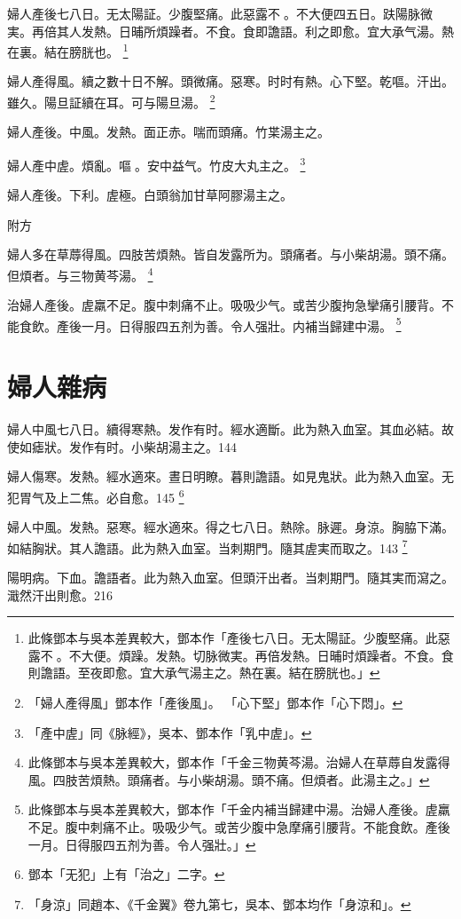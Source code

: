婦人產後七八日。无太陽証。少腹堅痛。此惡露不{\sungii 𥁞}。不大便四五日。趺陽脉微実。再倍其人发熱。日晡所煩躁者。不食。食即譫語。利之即愈。宜大承气湯。熱在裏。結在膀胱也。
	\footnote{
		此條鄧本与吳本差異較大，鄧本作「產後七八日。无太陽証。少腹堅痛。此惡露不{\sungii 𥁞}。不大便。煩躁。发熱。切脉微実。再倍发熱。日晡时煩躁者。不食。食則譫語。至夜即愈。宜大承气湯主之。熱在裏。結在膀胱也。」
	}

婦人產得風。續之數十日不解。頭微痛。惡寒。时时有熱。心下堅。乾嘔。汗出。雖久。陽旦証續在耳。可与陽旦湯。
	\footnote{
		「婦人產得風」鄧本作「產後風」。
		「心下堅」鄧本作「心下悶」。
	}

婦人產後。中風。发熱。面{\khaai 正}赤。喘而頭痛。竹枼湯主之。

婦人產中虗。煩亂。嘔{\sungii 𠱘}。安中益气。竹皮大丸主之。
	\footnote{
	「產中虗」同《脉經》，吳本、鄧本作「乳中虗」。
	}

婦人產後。下利。虗極。白頭翁加甘草阿膠湯主之。

附方

婦人多在草蓐得風。四肢苦煩熱。皆自发露所为。頭痛者。与小柴胡湯。頭不痛。但煩者。与三物黄芩湯。
	\footnote{
		此條鄧本与吳本差異較大，鄧本作「千金三物黄芩湯。治婦人在草蓐自发露得風。四肢苦煩熱。頭痛者。与小柴胡湯。頭不痛。但煩者。此湯主之。」
	}

治婦人產後。虗羸不足。腹中刺痛不止。吸吸少气。或苦少腹拘急攣痛引腰背。不能食飲。產後一月。日得服四五剂为善。令人强壯。内補当歸建中湯。
	\footnote{
		此條鄧本与吳本差異較大，鄧本作「千金内補当歸建中湯。治婦人產後。虗羸不足。腹中刺痛不止。吸吸少气。或苦少腹中急摩痛引腰背。不能食飲。產後一月。日得服四五剂为善。令人强壯。」
	}

\chapter{婦人雜病}

婦人中風七八日。續得寒熱。发作有时。經水適斷。此为熱入血室。其血必結。故使如瘧狀。发作有时。小柴胡湯主之。144

婦人傷寒。发熱。經水適來。晝日明瞭。暮則譫語。如見鬼狀。此为熱入血室。无犯胃气及上二焦。必自愈。145
	\footnote{
		鄧本「无犯」上有「治之」二字。
	}

婦人中風。发熱。惡寒。經水適來。得之七八日。熱除。脉遲。身涼。胸脇下滿。如結胸狀。其人譫語。此为熱入血室。当刺期門。隨其{\khaai 虗}実而取之。143
	\footnote{
		「身涼」同趙本、《千金翼》卷九第七，吳本、鄧本均作「身涼和」。
	}

陽明病。下血。譫語者。此为熱入血室。但頭汗出者。当刺期門。隨其実而瀉之。濈然汗出則愈。216

